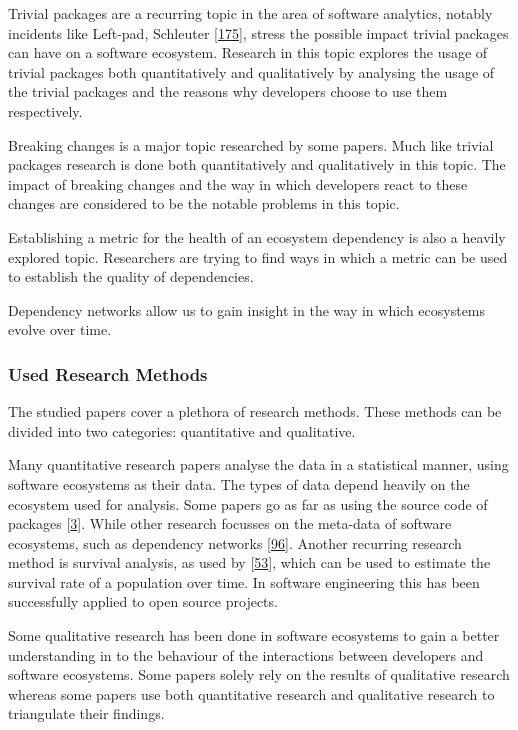 \documentclass[]{book}
\begin{document}
Trivial packages are a recurring topic in the area of software
analytics, notably incidents like Left-pad, Schleuter
{[}\protect\hyperlink{ref-NPM2016}{175}{]}, stress the possible impact
trivial packages can have on a software ecosystem. Research in this
topic explores the usage of trivial packages both quantitatively and
qualitatively by analysing the usage of the trivial packages and the
reasons why developers choose to use them respectively.

Breaking changes is a major topic researched by some papers. Much like
trivial packages research is done both quantitatively and qualitatively
in this topic. The impact of breaking changes and the way in which
developers react to these changes are considered to be the notable
problems in this topic.

Establishing a metric for the health of an ecosystem dependency is also
a heavily explored topic. Researchers are trying to find ways in which a
metric can be used to establish the quality of dependencies.

Dependency networks allow us to gain insight in the way in which
ecosystems evolve over time.

\subsubsection{Used Research Methods}\label{used-research-methods}

The studied papers cover a plethora of research methods. These methods
can be divided into two categories: quantitative and qualitative.

Many quantitative research papers analyse the data in a statistical
manner, using software ecosystems as their data. The types of data
depend heavily on the ecosystem used for analysis. Some papers go as far
as using the source code of packages
{[}\protect\hyperlink{ref-Abdalkareem2017}{3}{]}. While other research
focusses on the meta-data of software ecosystems, such as dependency
networks {[}\protect\hyperlink{ref-Kikas2017}{96}{]}. Another recurring
research method is survival analysis, as used by
{[}\protect\hyperlink{ref-Decan2018}{53}{]}, which can be used to
estimate the survival rate of a population over time. In software
engineering this has been successfully applied to open source projects.

Some qualitative research has been done in software ecosystems to gain a
better understanding in to the behaviour of the interactions between
developers and software ecosystems. Some papers solely rely on the
results of qualitative research whereas some papers use both
quantitative research and qualitative research to triangulate their
findings.
\end{document}
